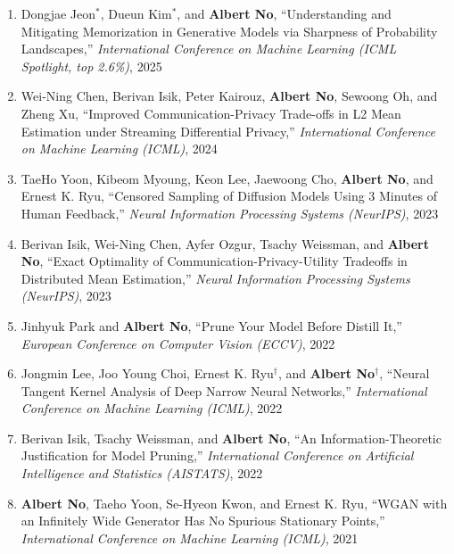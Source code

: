 \documentclass[10pt]{article}
\begin{document}
\begin{enumerate}[(C1)]
\item Dongjae Jeon$^*$, Dueun Kim$^*$, and {{\bf Albert No}},
``Understanding and Mitigating Memorization in Generative Models via Sharpness of Probability Landscapes,''
{\it International Conference on Machine Learning (ICML Spotlight, top 2.6\%)}, 2025\\

\item Wei-Ning Chen, Berivan Isik, Peter Kairouz, {{\bf Albert No}}, Sewoong Oh, and Zheng Xu,
``Improved Communication-Privacy Trade-offs in L2 Mean Estimation under Streaming Differential Privacy,''
{\it International Conference on Machine Learning (ICML)}, 2024\\

\item TaeHo Yoon, Kibeom Myoung, Keon Lee, Jaewoong Cho, {{\bf Albert No}}, and Ernest K. Ryu,
``Censored Sampling of Diffusion Models Using 3 Minutes of Human Feedback,''
{\it Neural Information Processing Systems (NeurIPS)}, 2023\\

\item Berivan Isik, Wei-Ning Chen, Ayfer Ozgur, Tsachy Weissman, and {{\bf Albert No}},
``Exact Optimality of Communication-Privacy-Utility Tradeoffs in Distributed Mean Estimation,''
{\it Neural Information Processing Systems (NeurIPS)}, 2023\\

\item Jinhyuk Park and {{\bf Albert No}},
``Prune Your Model Before Distill It,''
{\it European Conference on Computer Vision (ECCV)}, 2022\\

\item Jongmin Lee, Joo Young Choi, Ernest K. Ryu$^\dagger$, and {{\bf Albert No}}$^\dagger$,
``Neural Tangent Kernel Analysis of Deep Narrow Neural Networks,''
{\it International Conference on Machine Learning (ICML)}, 2022\\

\item Berivan Isik, Tsachy Weissman, and {{\bf Albert No}},
``An Information-Theoretic Justification for Model Pruning,''
{\it International Conference on Artificial Intelligence and Statistics (AISTATS)}, 2022\\

\item {{\bf Albert No}}, Taeho Yoon, Se-Hyeon Kwon, and Ernest K. Ryu,
``WGAN with an Infinitely Wide Generator Has No Spurious Stationary Points,''
{\it International Conference on Machine Learning (ICML)}, 2021\\


\end{enumerate}
\end{document}
